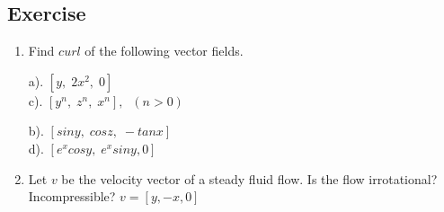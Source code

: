 \documentclass[aima331_lecturenotes_ku.tex]{subfiles}
\begin{document}
\subsection{Exercise}
\begin{enumerate}
\item Find $curl$ of the following vector fields.
  \begin{multicols}{2}
    a). $[y, \; 2x^2, \;0]$ \\[1mm]
    c). $[y^n, \; z^n, \;x^n], \;\;(n>0)$
    \columnbreak

    b). $[siny, \; cosz, \;-tanx]$ \\[1mm]
    d). $[e^xcosy, \; e^xsiny, 0]$
  \end{multicols}
\item Let $v$ be the velocity vector of a steady fluid flow. Is the flow irrotational? Incompressible? $v=[y, -x, 0]$

\end{enumerate}
\end{document}
